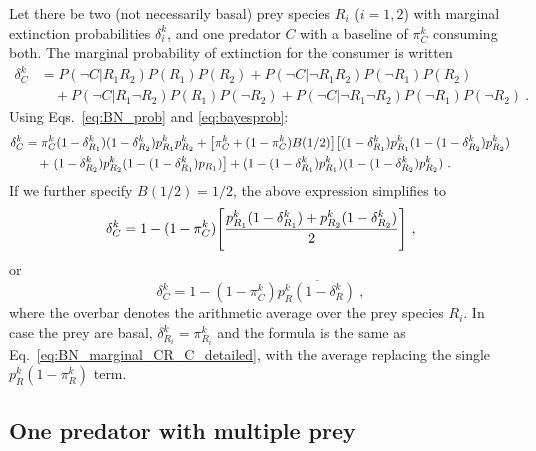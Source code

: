 \documentclass[11pt]{article}
\newcommand{\ol}[1]{\overline{#1}}
\let\originalleft\left
\let\originalright\right
\renewcommand{\left}{\mathopen{}\mathclose\bgroup\originalleft}
\renewcommand{\right}{\aftergroup\egroup\originalright}
\begin{document}
Let there be two (not necessarily basal) prey species $R_i$ ($i=1,2$) with marginal extinction probabilities $\delta_i^k$, and one predator $C$ with a baseline of $\pi_C^k$ consuming both. The marginal probability of extinction for the consumer is written
\begin{equation}
  \label{eq:BN_marginal_CRR}
  \begin{split}
    \delta_C^k &= P(\neg C|R_1 R_2) P(R_1) P(R_2) + P(\neg C|\neg R_1 R_2) P(\neg
    R_1) P(R_2) \\ &\quad + P(\neg C|R_1 \neg R_2) P(R_1) P(\neg R_2) +
    P(\neg C|\neg R_1 \neg R_2) P(\neg R_1) P(\neg R_2) \ .
  \end{split}
\end{equation}
Using Eqs.~\ref{eq:BN_prob} and \ref{eq:bayesprob}:
\begin{equation}
  \label{eq:BN_marginal_CRR_2}
  \begin{split}
    \delta_C^k &= \pi_C^k(1-\delta_{R_1}^k)(1-\delta_{R_2}^k)p_{R_1}^k p_{R_2}^k +
    \left[\pi_C^k + (1-\pi_C^k) B(1/2) \right] \left[ (1-\delta_{R_1}^k) p_{R_1}^k
      (1-(1-\delta_{R_2}^k) p_{R_2}^k) \right. \\ &\quad + \left.
      (1-\delta_{R_2}^k) p_{R_2}^k (1-(1-\delta_{R_1}^k) p_{R_1}) \right] +
    (1-(1-\delta_{R_1}^k) p_{R_1}^k) (1-(1-\delta_{R_2}^k) p_{R_2}^k) \ .
  \end{split}
\end{equation}
If we further specify $B(1/2)=1/2$, the above expression simplifies to
\begin{equation}
  \label{eq:BN_marginal_CRR_3}
  \delta_C^k = 1 - (1 - \pi_C^k) \left[ \frac{p_{R_1}^k (1 - \delta_{R_1}^k) +
      p_{R_2}^k (1 - \delta_{R_2}^k)}{2} \right] \ ,
\end{equation}
or
\begin{equation}
  \label{eq:BN_marginal_CRR_4}
  \delta_C^k = 1 - (1 - \pi_C^k) \ol{p_R^k (1 - \delta_R^k)} \ ,
\end{equation}
where the overbar denotes the arithmetic average over the prey species $R_i$. In case the prey are basal, $\delta_{R_i}^k = \pi_{R_i}^k$ and the formula is the same as Eq.~\ref{eq:BN_marginal_CR_C_detailed}, with the average replacing the single $p_R^k (1 - \pi_R^k)$ term.

\subsection{One predator with multiple prey} \label{sec:CmanyR}
\end{document}
